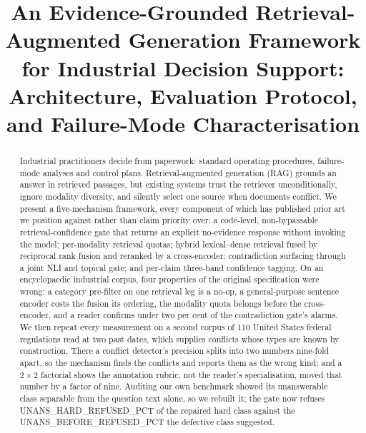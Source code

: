 \documentclass[conference]{IEEEtran}
\begin{document}
\title{An Evidence-Grounded Retrieval-Augmented Generation
Framework for Industrial Decision Support:
Architecture, Evaluation Protocol, and Failure-Mode Characterisation}

\author{
\and
{}
}

\maketitle

\begin{abstract}
Industrial practitioners decide from paperwork: standard operating
procedures, failure-mode analyses and control plans. Retrieval-augmented
generation (RAG) grounds an answer in retrieved passages, but existing systems
trust the retriever unconditionally, ignore modality diversity, and silently
select one source when documents conflict. We present a five-mechanism
framework, every component of which has published prior art we position
against rather than claim priority over: a code-level, non-bypassable
retrieval-confidence gate that returns an explicit no-evidence response
without invoking the model; per-modality retrieval quotas; hybrid
lexical--dense retrieval fused by reciprocal rank fusion and reranked by a
cross-encoder; contradiction surfacing through a joint NLI and topical gate;
and per-claim three-band confidence tagging. On an encyclopaedic industrial
corpus, four properties of the original specification were wrong: a category
pre-filter on one retrieval leg is a no-op, a general-purpose sentence encoder
costs the fusion its ordering, the modality quota belongs before the
cross-encoder, and a reader confirms under two per cent of the contradiction
gate's alarms. We then repeat every measurement on a second corpus of 110
United States federal regulations read at two past dates, which supplies
conflicts whose types are known by construction. There a conflict detector's
precision splits into two numbers nine-fold apart, so the mechanism finds the
conflicts and reports them as the wrong kind; and a $2\times2$ factorial shows
the annotation rubric, not the reader's specialisation, moved that number by a
factor of nine. Auditing our own benchmark showed its unanswerable class
separable from the question text alone, so we rebuilt it; the gate now refuses
{{UNANS_HARD_REFUSED_PCT}} of the repaired hard class against the
{{UNANS_BEFORE_REFUSED_PCT}} the defective class suggested.
\end{abstract}
\end{document}

